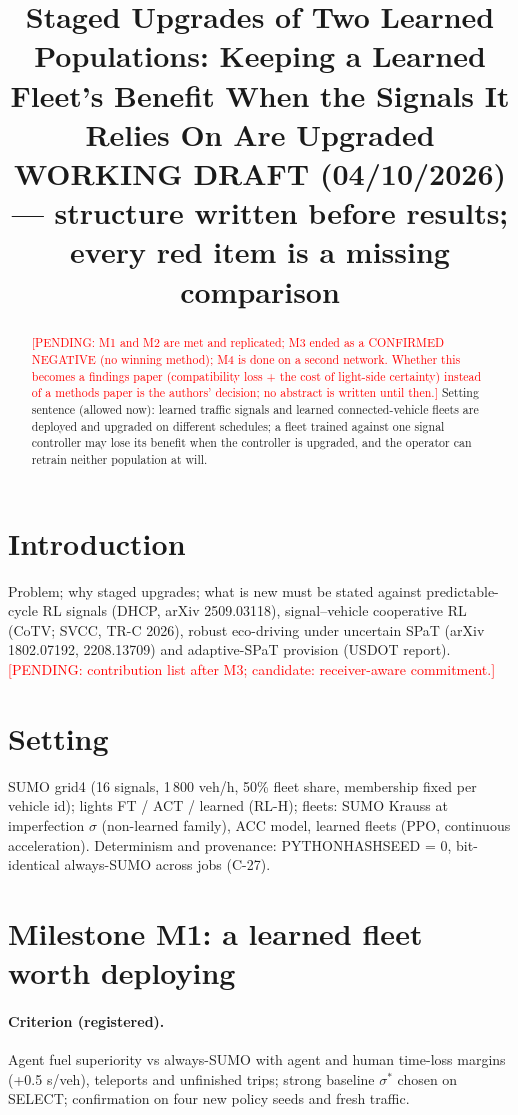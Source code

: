 \documentclass[11pt]{article}
\title{Staged Upgrades of Two Learned Populations: Keeping a Learned Fleet's Benefit When the Signals It Relies On Are Upgraded\\[4pt]
\large WORKING DRAFT (04/10/2026) --- structure written before results; every red item is a missing comparison}
\date{}
\newcommand{\pending}[1]{\textcolor{red}{[PENDING: #1]}}
\begin{document}
\maketitle

\begin{abstract}
\pending{M1 and M2 are met and replicated; M3 ended as a CONFIRMED NEGATIVE (no winning method); M4 is done on a second network. Whether
this becomes a findings paper (compatibility loss + the cost of light-side certainty) instead of a methods paper is the authors' decision;
no abstract is written until then.}
Setting sentence (allowed now): learned traffic signals and learned connected-vehicle fleets are deployed and upgraded on different
schedules; a fleet trained against one signal controller may lose its benefit when the controller is upgraded, and the operator can
retrain neither population at will.
\end{abstract}

\section{Introduction}
Problem; why staged upgrades; what is new must be stated against predictable-cycle RL signals (DHCP, arXiv 2509.03118),
signal--vehicle cooperative RL (CoTV; SVCC, TR-C 2026), robust eco-driving under uncertain SPaT (arXiv 1802.07192, 2208.13709) and
adaptive-SPaT provision (USDOT report). \pending{contribution list after M3; candidate: receiver-aware commitment.}

\section{Setting}
SUMO grid4 (16 signals, 1\,800 veh/h, 50\% fleet share, membership fixed per vehicle id); lights FT / ACT / learned (RL-H);
fleets: SUMO Krauss at imperfection $\sigma$ (non-learned family), ACC model, learned fleets (PPO, continuous acceleration).
Determinism and provenance: PYTHONHASHSEED = 0, bit-identical always-SUMO across jobs (C-27).

\section{Milestone M1: a learned fleet worth deploying}
\paragraph{Criterion (registered).} Agent fuel superiority vs always-SUMO with agent and human time-loss margins (+0.5 s/veh),
teleports and unfinished trips; strong baseline $\sigma^*$ chosen on SELECT; confirmation on four new policy seeds and fresh traffic.
\end{document}
